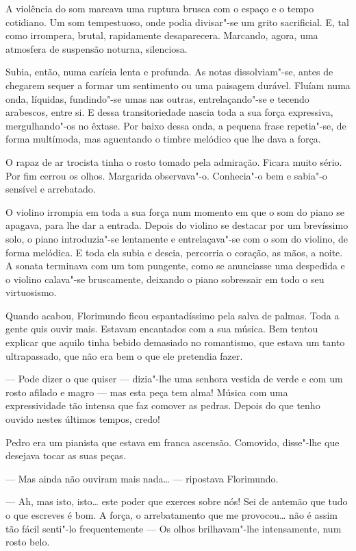 A violência do som marcava uma ruptura brusca com o espaço e o tempo
cotidiano. Um som tempestuoso, onde podia divisar"-se um grito
sacrificial. E, tal como irrompera, brutal, rapidamente desaparecera.
Marcando, agora, uma atmosfera de suspensão noturna, silenciosa.

Subia, então, numa carícia lenta e profunda. As notas dissolviam"-se,
antes de chegarem sequer a formar um sentimento ou uma paisagem durável.
Fluíam numa onda, líquidas, fundindo"-se umas nas outras, entrelaçando"-se
e tecendo arabescos, entre si. E dessa transitoriedade nascia toda a sua
força expressiva, mergulhando"-os no êxtase. Por baixo dessa onda, a
pequena frase repetia"-se, de forma multímoda, mas aguentando o timbre
melódico que lhe dava a força.

O rapaz de ar trocista tinha o rosto tomado pela admiração. Ficara muito
sério. Por fim cerrou os olhos. Margarida observava"-o. Conhecia"-o bem e
sabia"-o sensível e arrebatado.

O violino irrompia em toda a sua força num momento em que o som do piano
se apagava, para lhe dar a entrada. Depois do violino se destacar por um
brevíssimo solo, o piano introduzia"-se lentamente e entrelaçava"-se com o
som do violino, de forma melódica. E toda ela subia e descia, percorria
o coração, as mãos, a noite. A sonata terminava com um tom pungente,
como se anunciasse uma despedida e o violino calava"-se bruscamente,
deixando o piano sobressair em todo o seu virtuosismo.

Quando acabou, Florimundo ficou espantadíssimo pela salva de palmas.
Toda a gente quis ouvir mais. Estavam encantados com a sua música. Bem
tentou explicar que aquilo tinha bebido demasiado no romantismo, que
estava um tanto ultrapassado, que não era bem o que ele pretendia fazer.

--- Pode dizer o que quiser --- dizia"-lhe uma senhora vestida de verde e com
um rosto afilado e magro --- mas esta peça tem alma! Música com uma
expressividade tão intensa que faz comover as pedras. Depois do que
tenho ouvido nestes últimos tempos, credo!

Pedro era um pianista que estava em franca ascensão. Comovido, disse"-lhe
que desejava tocar as suas peças.

--- Mas ainda não ouviram mais nada\ldots{} --- ripostava Florimundo.

--- Ah, mas isto, isto\ldots{} este poder que exerces sobre nós! Sei de antemão
que tudo o que escreves é bom. A força, o arrebatamento que me
provocou\ldots{} não é assim tão fácil senti"-lo frequentemente --- Os olhos
brilhavam"-lhe intensamente, num rosto belo.

